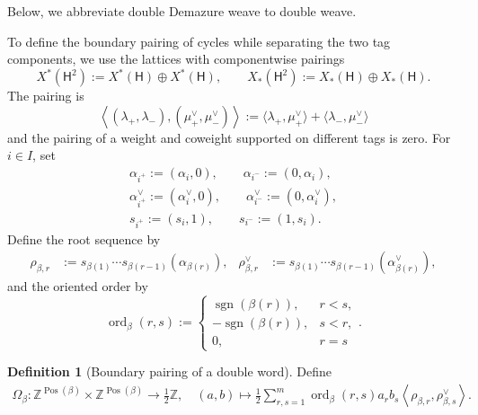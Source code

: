 \documentclass[10pt,a4paper]{article}
\theoremstyle{definition}
\newtheorem{definition}[theorem]{Definition}
\theoremstyle{remark}
\newcommand{\torusH}{\mathsf{H}}
\begin{document}
Below, we abbreviate double Demazure weave to double weave.

To define the boundary pairing of cycles while separating the two tag
components, we use the lattices with componentwise pairings
\[
 X^*(\torusH^2)
 :=X^*(\torusH)\oplus X^*(\torusH),
 \qquad
 X_*(\torusH^2)
 :=X_*(\torusH)\oplus X_*(\torusH).
\]
The pairing is
\[
 \left\langle(\lambda_+,\lambda_-),
 (\mu_+^\vee,\mu_-^\vee)\right\rangle
 :=
 \langle\lambda_+,\mu_+^\vee\rangle
 +\langle\lambda_-,\mu_-^\vee\rangle
\]
and the pairing of a weight and coweight supported on different tags is zero.
For \(i\in I\), set
\[
 \begin{gathered}
 \alpha_{i^+}:=(\alpha_i,0),\qquad
 \alpha_{i^-}:=(0,\alpha_i),\\
 \alpha_{i^+}^\vee:=(\alpha_i^\vee,0),\qquad
 \alpha_{i^-}^\vee:=(0,\alpha_i^\vee),\\
 s_{i^+}:=(s_i,1),\qquad
 s_{i^-}:=(1,s_i).
 \end{gathered}
\]
Define the root sequence by
\begin{align}
 \rho_{\beta,r}
 &:=s_{\beta(1)}\cdots s_{\beta(r-1)}(\alpha_{\beta(r)}),&
 \rho_{\beta,r}^\vee
 &:=s_{\beta(1)}\cdots s_{\beta(r-1)}(\alpha_{\beta(r)}^\vee),
 \label{eq:component-root-sequence}
\end{align}
and the oriented order by
\begin{equation}
 \operatorname{ord}_\beta(r,s)
 :=
 \begin{cases}
  \operatorname{sgn}(\beta(r)),&r<s,\\
  -\operatorname{sgn}(\beta(r)),&s<r,\\
  0,&r=s
 \end{cases}.
 \label{eq:component-oriented-order}
\end{equation}

\begin{definition}[Boundary pairing of a double word]
\label{def:double-boundary-pairing}
Define
\begin{equation}
 \begin{aligned}
 \Omega_\beta:
 \mathbb Z^{\operatorname{Pos}(\beta)}
 \times\mathbb Z^{\operatorname{Pos}(\beta)}
 \longrightarrow\tfrac12\mathbb Z, \quad
 (a,b)
 \longmapsto
 \frac12\sum_{r,s=1}^{m}
 \operatorname{ord}_\beta(r,s)a_r b_s
 \left\langle\rho_{\beta,r},\rho_{\beta,s}^\vee\right\rangle.
 \end{aligned}
 \label{eq:double-boundary-pairing}
\end{equation}
\end{definition}
\end{document}
